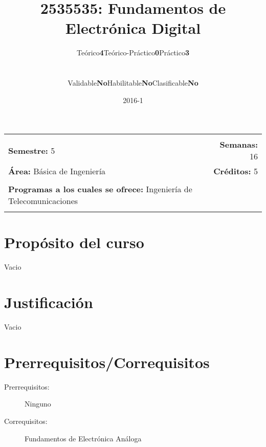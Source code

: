 \documentclass[11pt]{article}
\title{2535535: Fundamentos de Electrónica Digital}
\author{\begin{tabular} {c|c|c|c|c|c} Teórico & \textbf{4} & Teórico-Práctico & \textbf{0} & Práctico & \textbf{3}\end{tabular}
\\
\begin{tabular} {c|c|c|c|c|c} Validable & \textbf{No} & Habilitable & \textbf{No} & Clasificable & \textbf{No}\end{tabular}}
\date{2016-1}
\newcommand{\blankline}{\quad\pagebreak[2]}
\begin{document}
\maketitle

\begin{tabular*}{.93\textwidth}{@{\extracolsep{\fill}}lr}
\hline\\

\textbf{Semestre:} 5 & \textbf{Semanas:} 16
\\
\textbf{Área:} Básica de Ingeniería &    \textbf{Créditos:} 5 
\\ & \\
\textbf{Programas a los cuales se ofrece:} Ingeniería de Telecomunicaciones
\\ & \\
\hline
\end{tabular*}

\vspace{5 mm}

\section*{Propósito del curso}

Vacio



\section*{Justificación}

Vacio

\section*{Prerrequisitos/Correquisitos}
\begin{description}
\item [Prerrequisitos:] Ninguno
\item[Correquisitos:] Fundamentos de Electrónica Análoga
\end{description}
\end{document}
